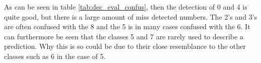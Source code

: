 As can be seen in table \ref{tab:dec_eval_confus}, then the detection of 0 and 4 is quite good, but there is a large amount of miss detected numbers.
The 2's and 3's are often confused with the 8 and the 5 is in many cases confused with the 6.
It can furthermore be seen that the classes 5 and 7 are rarely used to describe a prediction.
Why this is so could be due to their close resemblance to the other classes such as 6 in the case of 5.